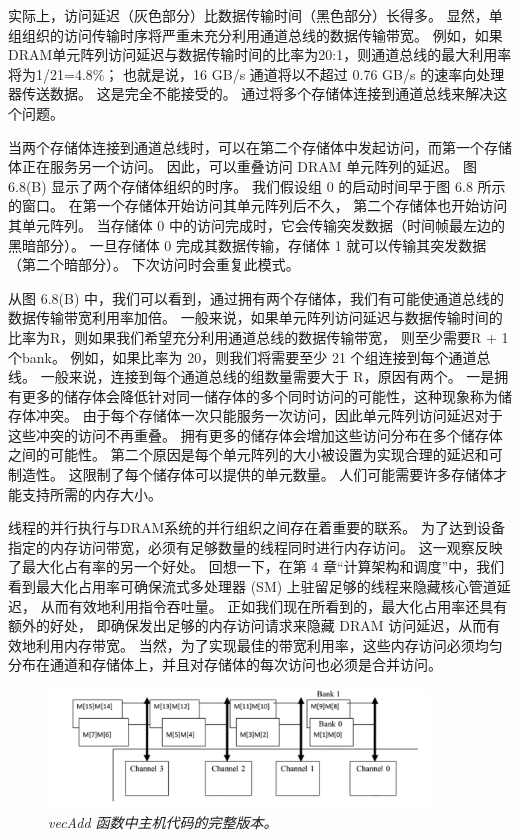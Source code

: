 实际上，访问延迟（灰色部分）比数据传输时间（黑色部分）长得多。 
显然，单组组织的访问传输时序将严重未充分利用通道总线的数据传输带宽。 
例如，如果DRAM单元阵列访问延迟与数据传输时间的比率为20:1，则通道总线的最大利用率将为1/21=4.8\%； 
也就是说，16 GB/s 通道将以不超过 0.76 GB/s 的速率向处理器传送数据。 
这是完全不能接受的。 通过将多个存储体连接到通道总线来解决这个问题。

当两个存储体连接到通道总线时，可以在第二个存储体中发起访问，而第一个存储体正在服务另一个访问。 
因此，可以重叠访问 DRAM 单元阵列的延迟。 图 6.8(B) 显示了两个存储体组织的时序。 
我们假设组 0 的启动时间早于图 6.8 所示的窗口。 在第一个存储体开始访问其单元阵列后不久，
第二个存储体也开始访问其单元阵列。 当存储体 0 中的访问完成时，它会传输突发数据（时间帧最左边的黑暗部分）。 
一旦存储体 0 完成其数据传输，存储体 1 就可以传输其突发数据（第二个暗部分）。 下次访问时会重复此模式。

从图 6.8(B) 中，我们可以看到，通过拥有两个存储体，我们有可能使通道总线的数据传输带宽利用率加倍。 
一般来说，如果单元阵列访问延迟与数据传输时间的比率为R，则如果我们希望充分利用通道总线的数据传输带宽，
则至少需要R + 1个bank。 例如，如果比率为 20，则我们将需要至少 21 个组连接到每个通道总线。 
一般来说，连接到每个通道总线的组数量需要大于 R，原因有两个。 
一是拥有更多的储存体会降低针对同一储存体的多个同时访问的可能性，这种现象称为储存体冲突。 
由于每个存储体一次只能服务一次访问，因此单元阵列访问延迟对于这些冲突的访问不再重叠。 
拥有更多的储存体会增加这些访问分布在多个储存体之间的可能性。 
第二个原因是每个单元阵列的大小被设置为实现合理的延迟和可制造性。 这限制了每个储存体可以提供的单元数量。 
人们可能需要许多存储体才能支持所需的内存大小。

线程的并行执行与DRAM系统的并行组织之间存在着重要的联系。 
为了达到设备指定的内存访问带宽，必须有足够数量的线程同时进行内存访问。 
这一观察反映了最大化占有率的另一个好处。 
回想一下，在第 4 章“计算架构和调度”中，我们看到最大化占用率可确保流式多处理器 (SM) 上驻留足够的线程来隐藏核心管道延迟，
从而有效地利用指令吞吐量。 正如我们现在所看到的，最大化占用率还具有额外的好处，
即确保发出足够的内存访问请求来隐藏 DRAM 访问延迟，从而有效地利用内存带宽。 
当然，为了实现最佳的带宽利用率，这些内存访问必须均匀分布在通道和存储体上，并且对存储体的每次访问也必须是合并访问。

\begin{figure}[H]
	\centering
	\includegraphics[width=0.9\textwidth]{figs/F6.9.png}
	\caption{\textit{\color{red} vecAdd 函数中主机代码的完整版本。}}
\end{figure}

